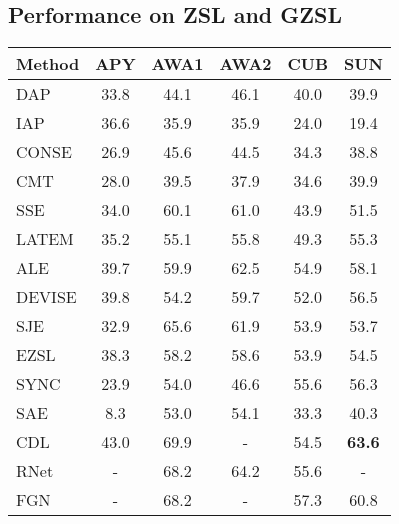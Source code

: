 \documentclass[10pt,twocolumn,letterpaper]{article}
\begin{document}
\subsection{Performance on ZSL and GZSL}
\begin{table}[t]
\begin{small}
\begin{center}
\begin{tabular}{|l|c|c|c|c|c|}
\hline
\textbf{Method}     &  \textbf{APY }    &  \textbf{AWA1}   &  \textbf{AWA2}  & \textbf{CUB }  &  \textbf{SUN} \\
\hline
\hline
DAP \cite{lampert2009learning}              &   33.8   &   44.1   &   46.1   &   40.0   &   39.9   \\
IAP \cite{lampert2009learning}              &   36.6   &   35.9   &   35.9   &   24.0   &   19.4   \\
CONSE \cite{Norouzi2014ZeroShotLB}          &   26.9   &   45.6   &   44.5   &   34.3   &   38.8   \\
CMT \cite{Socher2013ZeroShotLT}             &   28.0   &   39.5   &   37.9   &   34.6   &   39.9 \\
SSE \cite{Zhang2015ZeroShotLV}              &   34.0   &   60.1   &   61.0   &   43.9   &   51.5   \\
LATEM \cite{Xian2016LatentEF}               &   35.2   &   55.1   &   55.8   &   49.3   &   55.3   \\
ALE \cite{akata2013label}                   &   39.7   &   59.9   &   62.5   &   54.9   &   58.1   \\
DEVISE \cite{frome2013devise}               &   39.8   &   54.2   &   59.7   &   52.0   &   56.5 \\
SJE \cite{akata2015evaluation}              &   32.9   &   65.6   &   61.9   &   53.9   &   53.7   \\
EZSL \cite{romera2015embarrassingly}        &   38.3   &   58.2   &   58.6   &   53.9   &   54.5   \\
SYNC \cite{Changpinyo2016SynthesizedCF}     &   23.9   &   54.0   &   46.6   &   55.6   &   56.3   \\
SAE \cite{Kodirov2017SemanticAF}            &   8.3    &   53.0   &   54.1   &   33.3   &   40.3 \\
CDL \cite{jiang2018learning}                &  43.0   &   69.9   &   -      &   54.5   &   \textbf{63.6} \\
RNet \cite{sung2018learning}                &   -      &   68.2   &   64.2   &   55.6   &   - \\
FGN \cite{xian2018feature}               &   -      &   68.2   &   -   &   57.3   & 60.8 \\

\end{tabular}
\end{center}
\end{small}
\end{table}
\end{document}
